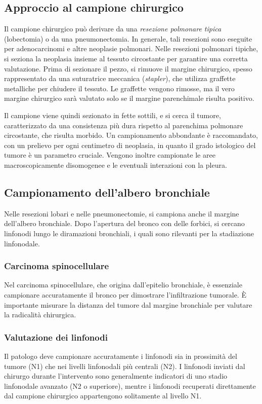 \subsection{Approccio al campione chirurgico}
Il campione chirurgico può derivare da una \textit{resezione polmonare tipica} (lobectomia) o da una pneumonectomia. In generale, tali resezioni sono eseguite per adenocarcinomi e altre neoplasie polmonari. Nelle resezioni polmonari tipiche, si seziona la neoplasia insieme al tessuto circostante per garantire una corretta valutazione. Prima di sezionare il pezzo, si rimuove il margine chirurgico, spesso rappresentato da una suturatrice meccanica (\textit{stapler}), che utilizza graffette metalliche per chiudere il tessuto. Le graffette vengono rimosse, ma il vero margine chirurgico sarà valutato solo se il margine parenchimale risulta positivo. 

Il campione viene quindi sezionato in fette sottili, e si cerca il tumore, caratterizzato da una consistenza più dura rispetto al parenchima polmonare circostante, che risulta morbido. Un campionamento abbondante è raccomandato, con un prelievo per ogni centimetro di neoplasia, in quanto il grado istologico del tumore è un parametro cruciale. Vengono inoltre campionate le aree macroscopicamente disomogenee e le eventuali interazioni con la pleura.

\subsection{Campionamento dell’albero bronchiale}
Nelle resezioni lobari e nelle pneumonectomie, si campiona anche il margine dell'albero bronchiale. Dopo l’apertura del bronco con delle forbici, si cercano linfonodi lungo le diramazioni bronchiali, i quali sono rilevanti per la stadiazione linfonodale.

\subsubsection{Carcinoma spinocellulare}
Nel carcinoma spinocellulare, che origina dall'epitelio bronchiale, è essenziale campionare accuratamente il bronco per dimostrare l'infiltrazione tumorale. È importante misurare la distanza del tumore dal margine bronchiale per valutare la radicalità chirurgica.

\subsubsection{Valutazione dei linfonodi}
Il patologo deve campionare accuratamente i linfonodi sia in prossimità del tumore (N1) che nei livelli linfonodali più centrali (N2). I linfonodi inviati dal chirurgo durante l'intervento sono generalmente indicatori di uno stadio linfonodale avanzato (N2 o superiore), mentre i linfonodi recuperati direttamente dal campione chirurgico appartengono solitamente al livello N1.

